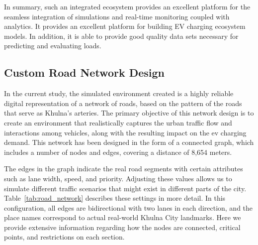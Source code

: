 \documentclass{thesis-library}
\begin{document}
In summary, such an integrated ecosystem provides an excellent platform for the seamless integration of simulations and real-time monitoring coupled with analytics. It provides an excellent platform for building EV charging ecosystem models. In addition, it is able to provide good quality data sets necessary for predicting and evaluating loads.

\subsection{Custom Road Network Design}

In the current study, the simulated environment created is a highly reliable digital representation of a network of roads, based on the pattern of the roads that serve as Khulna’s arteries. The primary objective of this network design is to create an environment that realistically captures the urban traffic flow and interactions among vehicles, along with the resulting impact on the \Gls{ev} charging demand. This network has been designed in the form of a connected graph, which includes a number of nodes and edges, covering a distance of 8,654 meters.

The edges in the graph indicate the real road segments with certain attributes such as lane width, speed, and priority. Adjusting these values allows us to simulate different traffic scenarios that might exist in different parts of the city. Table~\ref{tab:road_network} describes these settings in more detail. In this configuration, all edges are bidirectional with two lanes in each direction, and the place names correspond to actual real-world Khulna City landmarks. Here we provide extensive information regarding how the nodes are connected, critical points, and restrictions on each section.
\end{document}
